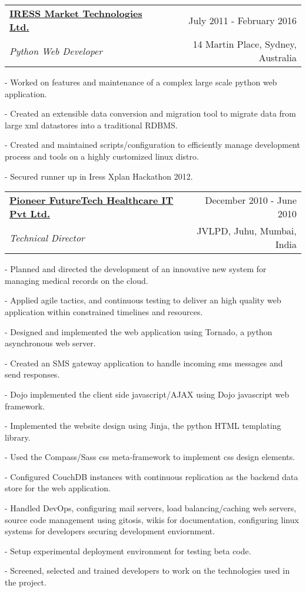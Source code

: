 \documentclass[10pt]{article}
\makeatletter
\newcommand{\employer}[4]{ 
        \vspace*{6pt}
	\begin{tabular*}{\textwidth}{l@{\extracolsep{\fill}}r}
	\textbf{#1} & #2 \\
                #3  & #4 \\ 
	\end{tabular*}
}
\newenvironment{achievements}{
        \vspace{-0pt}
        \begin{list}
        {}
        {\topsep 0pt \itemsep -3pt}
}
{
        \end{list}
}
\makeatother
\begin{document}
\employer{\href{http://www.iress.com/}{IRESS Market Technologies Ltd.}}{July 2011 - February 2016}{\emph{Python Web Developer}} {14 Martin Place, Sydney, Australia}
	\begin{achievements}
                \item[-] Worked on features and maintenance of a complex large scale python web application.
                \item[-] Created an extensible data conversion and migration tool to migrate data from large xml datastores into a traditional RDBMS.
                \item[-] Created and maintained scripts/configuration to efficiently manage development process and tools on a highly customized linux distro.
                \item[-] Secured runner up in Iress Xplan Hackathon 2012.
	\end{achievements}
\employer{\href{http://www.pfhit.com/}{Pioneer FutureTech Healthcare IT Pvt Ltd.}}{December 2010 - June 2010}{\emph{Technical Director}} {JVLPD, Juhu, Mumbai, India}
	\begin{achievements}
                \item[-] Planned and directed the development of an innovative new system for managing medical records on the cloud.
                \item[-] Applied agile tactics, and continuous testing to deliver an high quality web application within constrained timelines and resources.
                \item[-] Designed and implemented the web application using Tornado, a python asynchronous web server.
                \item[-] Created an SMS gateway application to handle incoming sms messages and send responses.
                \item[-] Dojo implemented the client side javascript/AJAX using Dojo javascript web framework.
                \item[-] Implemented the website design using Jinja, the python HTML templating library.
                \item[-] Used the Compass/Sass css meta-framework to implement css design elements.
                \item[-] Configured CouchDB instances with continuous replication as the backend data store for the web application.
                \item[-] Handled DevOps, configuring mail servers, load balancing/caching web servers, source code management using gitosis, wikis for documentation, configuring linux systems for developers securing development enviornment.
                \item[-] Setup experimental deployment environment for testing beta code.
                \item[-] Screened, selected and trained developers to work on the technologies used in the project.
	\end{achievements}
\end{document}
